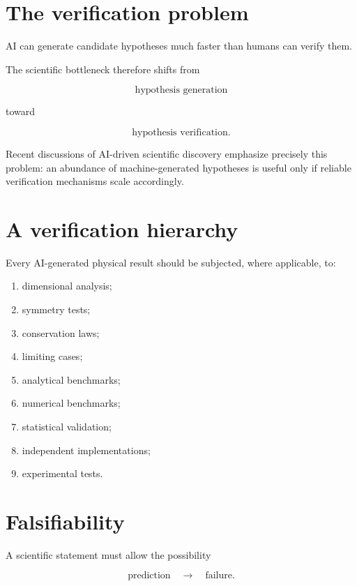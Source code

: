 \documentclass[11pt,a4paper,oneside]{book}
\begin{document}
\section{The verification problem}

AI can generate candidate hypotheses much faster than humans can verify them.

The scientific bottleneck therefore shifts from

\begin{equation}
\text{hypothesis generation}
\end{equation}

toward

\begin{equation}
\text{hypothesis verification}.
\end{equation}

Recent discussions of AI-driven scientific discovery emphasize precisely this
problem: an abundance of machine-generated hypotheses is useful only if
reliable verification mechanisms scale accordingly.

\section{A verification hierarchy}

Every AI-generated physical result should be subjected, where applicable, to:

\begin{enumerate}
\item dimensional analysis;
\item symmetry tests;
\item conservation laws;
\item limiting cases;
\item analytical benchmarks;
\item numerical benchmarks;
\item statistical validation;
\item independent implementations;
\item experimental tests.
\end{enumerate}

\section{Falsifiability}

A scientific statement must allow the possibility

\begin{equation}
\text{prediction}
\quad\longrightarrow\quad
\text{failure}.
\end{equation}
\end{document}
